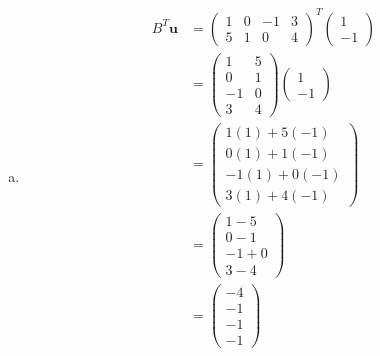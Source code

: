 \documentclass[11pt,letterpaper]{article}
\begin{document}
\begin{enumerate}[(a)]
\item 
	\[
	\begin{aligned}
	B^T \mathbf{u}&= \begin{pmatrix} 1 & 0 & -1 & 3 \\ 5 & 1 & 0 & 4 \end{pmatrix}^T \begin{pmatrix} 1 \\ -1 \end{pmatrix} \\[0.3cm]
	&= \begin{pmatrix} 1 & 5 \\ 0 & 1 \\ -1 & 0 \\ 3 & 4 \end{pmatrix} \begin{pmatrix} 1 \\ -1 \end{pmatrix} \\[0.3cm]
	&= \begin{pmatrix} 1(1) + 5(-1) \\ 0(1) + 1(-1) \\ -1(1) + 0(-1) \\ 3(1) + 4(-1) \end{pmatrix} \\[0.3cm]
	&= \begin{pmatrix} 1 - 5 \\ 0 - 1 \\ -1 + 0 \\ 3 - 4 \end{pmatrix} \\[0.3cm]
	&= \begin{pmatrix} -4 \\ -1 \\ -1 \\ -1 \end{pmatrix}
	\end{aligned}
	\]
\end{enumerate}



\newpage
\end{document}
